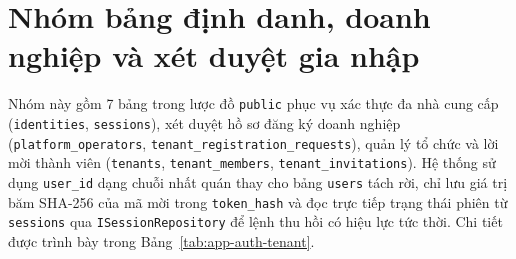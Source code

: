 \section{Nhóm bảng định danh, doanh nghiệp và xét duyệt gia nhập}
Nhóm này gồm 7 bảng trong lược đồ \texttt{public} phục vụ xác thực đa nhà cung cấp (\texttt{identities}, \texttt{sessions}), xét duyệt hồ sơ đăng ký doanh nghiệp (\texttt{platform\_\hspace{0pt}operators}, \texttt{tenant\_\hspace{0pt}registration\_\hspace{0pt}requests}), quản lý tổ chức và lời mời thành viên (\texttt{tenants}, \texttt{tenant\_\hspace{0pt}members}, \texttt{tenant\_\hspace{0pt}invitations}). Hệ thống sử dụng \texttt{user\_\hspace{0pt}id} dạng chuỗi nhất quán thay cho bảng \texttt{users} tách rời, chỉ lưu giá trị băm SHA-256 của mã mời trong \texttt{token\_\hspace{0pt}hash} và đọc trực tiếp trạng thái phiên từ \texttt{sessions} qua \texttt{ISession\hspace{0pt}Repository} để lệnh thu hồi có hiệu lực tức thời. Chi tiết được trình bày trong Bảng~\ref{tab:app-auth-tenant}.

